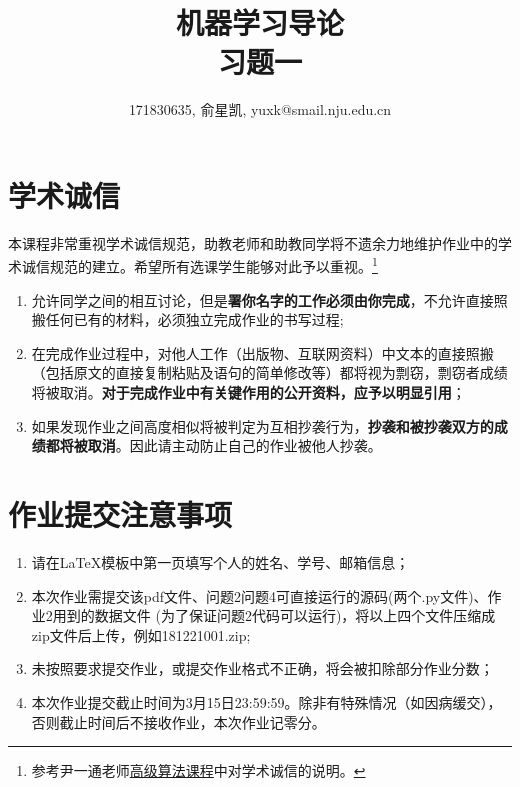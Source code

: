 \documentclass[a4paper,UTF8]{article}
\theoremstyle{definition}
\begin{document}
\title{机器学习导论\\习题一}
\author{171830635, 俞星凯, yuxk@smail.nju.edu.cn}
\maketitle


\section*{学术诚信}

本课程非常重视学术诚信规范，助教老师和助教同学将不遗余力地维护作业中的学术诚信规范的建立。希望所有选课学生能够对此予以重视。\footnote{参考尹一通老师\href{http://tcs.nju.edu.cn/wiki/}{高级算法课程}中对学术诚信的说明。}

\begin{tcolorbox}
	\begin{enumerate}
		\item[(1)] 允许同学之间的相互讨论，但是{\color{red}\textbf{署你名字的工作必须由你完成}}，不允许直接照搬任何已有的材料，必须独立完成作业的书写过程;
		\item[(2)] 在完成作业过程中，对他人工作（出版物、互联网资料）中文本的直接照搬（包括原文的直接复制粘贴及语句的简单修改等）都将视为剽窃，剽窃者成绩将被取消。{\color{red}\textbf{对于完成作业中有关键作用的公开资料，应予以明显引用}}；
		\item[(3)] 如果发现作业之间高度相似将被判定为互相抄袭行为，{\color{red}\textbf{抄袭和被抄袭双方的成绩都将被取消}}。因此请主动防止自己的作业被他人抄袭。
	\end{enumerate}
\end{tcolorbox}

\section*{作业提交注意事项}
\begin{tcolorbox}
	\begin{enumerate}
		\item[(1)] 请在LaTeX模板中第一页填写个人的姓名、学号、邮箱信息；
		\item[(2)] 本次作业需提交该pdf文件、问题2问题4可直接运行的源码(两个.py文件)、作业2用到的数据文件 (为了保证问题2代码可以运行)，将以上四个文件压缩成zip文件后上传，例如181221001.zip;
		\item[(3)] 未按照要求提交作业，或提交作业格式不正确，将会被扣除部分作业分数；
		\item[(4)] 本次作业提交截止时间为3月15日23:59:59。除非有特殊情况（如因病缓交），否则截止时间后不接收作业，本次作业记零分。
	\end{enumerate}
\end{tcolorbox}
\end{document}
